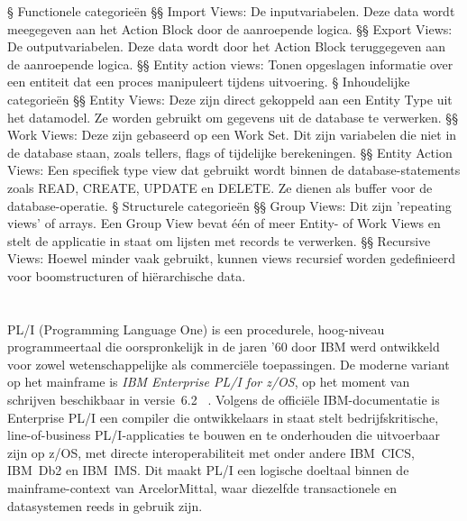  \begin{easylist}
     § Functionele categorieën
     §§ Import Views: De inputvariabelen. Deze data wordt meegegeven aan het Action Block door de aanroepende logica.
     §§ Export Views: De outputvariabelen. Deze data wordt door het Action Block teruggegeven aan de aanroepende logica.
     §§ Entity action views: Tonen opgeslagen informatie over een entiteit dat een proces manipuleert tijdens uitvoering.
     \newline
     § Inhoudelijke categorieën
     §§ Entity Views: Deze zijn direct gekoppeld aan een Entity Type uit het datamodel. Ze worden gebruikt om gegevens uit de database te verwerken.
     §§ Work Views: Deze zijn gebaseerd op een Work Set. Dit zijn variabelen die niet in de database staan, zoals tellers, flags of tijdelijke berekeningen.
     §§ Entity Action Views: Een specifiek type view dat gebruikt wordt binnen de database-statements zoals READ, CREATE, UPDATE en DELETE. Ze dienen als buffer voor de database-operatie.
     \newline
     § Structurele categorieën
     §§ Group Views: Dit zijn 'repeating views' of arrays. Een Group View bevat één of meer Entity- of Work Views en stelt de applicatie in staat om lijsten met records te verwerken.
     §§ Recursive Views: Hoewel minder vaak gebruikt, kunnen views recursief worden gedefinieerd voor boomstructuren of hiërarchische data.
 \end{easylist}
 
 \section{}%
 \label{sec:PLI}
 PL/I (Programming Language One) is een procedurele, hoog-niveau programmeertaal die oorspronkelijk in de jaren '60 
 door IBM werd ontwikkeld voor zowel wetenschappelijke als commerciële toepassingen. De moderne variant op het 
 mainframe is \emph{IBM Enterprise PL/I for z/OS}, op het moment van schrijven beschikbaar in versie~6.2~
 \autocite{IBM2025}. Volgens de officiële IBM-documentatie is Enterprise PL/I een compiler die ontwikkelaars in 
 staat stelt bedrijfskritische, line-of-business PL/I-applicaties te bouwen en te onderhouden die uitvoerbaar 
 zijn op z/OS, met directe interoperabiliteit met onder andere IBM~CICS, IBM~Db2 en IBM~IMS. Dit maakt PL/I een 
 logische doeltaal binnen de mainframe-context van ArcelorMittal, waar diezelfde transactionele en datasystemen 
 reeds in gebruik zijn.

